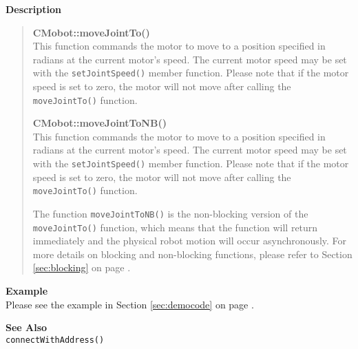 \noindent
{\bf Description}\\
\vspace{-12pt}
\begin{quote}
{\bf CMobot::moveJointTo()}\\
This function commands the motor to move to a position specified in radians at
the current motor's speed. The current motor speed may be set with the
\texttt{setJointSpeed()} member function. Please note that if the motor speed
is set to zero, the motor will not move after calling the
\texttt{moveJointTo()} function. 

{\bf CMobot::moveJointToNB()}\\
This function commands the motor to move to a position specified in radians at
the current motor's speed. The current motor speed may be set with the
\texttt{setJointSpeed()} member function. Please note that if the motor speed
is set to zero, the motor will not move after calling the
\texttt{moveJointTo()} function. 

The function \texttt{moveJointToNB()} is the non-blocking version of
the \texttt{moveJointTo()} function, which means that the function will return
immediately and the physical robot motion will occur asynchronously. For
more details on blocking and non-blocking functions, please refer to 
Section \ref{sec:blocking} on page \pageref{sec:blocking}.\\
\end{quote}

\noindent
{\bf Example}\\
Please see the example in Section \ref{sec:democode} on page \pageref{sec:democode}.\\
\noindent

\noindent
{\bf See Also}\\
\texttt{connectWithAddress()}

